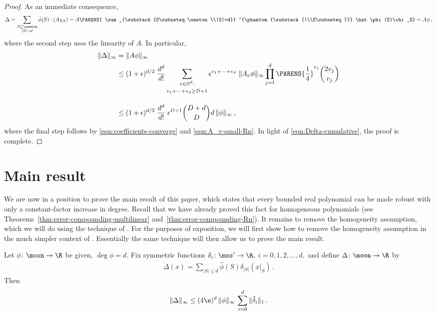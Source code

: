 \begin{proof}
As an immediate consequence, 
\begin{align*}
\Delta = \sum_{\substack{S\subseteq\oneton\\|S|=d}}
	\hat\phi(S)\cdot (A\chi_S)
       = A
	   \PARENS{
	   \sum_{\substack{S\subseteq\oneton\\|S|=d}}
	       ^{\phantom{\substack{|\\S\subseteq}}}
	   \hat\phi(S)\chi_S}
       = A\phi\,,
\end{align*}
where the second step uses the linearity of $A$. In 
particular,
\begin{align*}
\|\Delta\|_\infty &=\|A\phi\|_\infty \\
&\leq (1+\epsilon)^{d/2}\;\frac{d^d}{d!}\sum_{\substack{\rule{0mm}{2mm}v\in\mathbb
N^d:\\\rule{0mm}{3mm}v_1+\cdots+v_d\geq D+1}} 
 \epsilon^{v_1+\cdots+v_d}
  \; \|A_v\phi\|_\infty\prod_{j=1}^d
  \PARENS{\frac14}^{v_j}{2v_j\choose v_j}\\
&\rule{0mm}{9mm}\leq
(1+\epsilon)^{d/2}\;\frac{d^d}{d!}\;\epsilon^{D+1}{D+d\choose D}
d\,\|\phi\|_\infty\,,
\end{align*}
where the final step follows by
\eqref{eqn:coefficients-converge} and
\eqref{eqn:A_v-small-Rn}.
In light of \eqref{eqn:Delta-cumulative}, the proof is
complete.
\end{proof}




\section{Main result}
\label{sec:main}


We are now in a position to prove the main result of this
paper, which states that every bounded real polynomial 
can be made robust with only a constant-factor increase
in degree. Recall that we have already proved this fact for
homogeneous polynomials (see
Theorems~\ref{thm:error-compounding-multilinear}
and~\ref{thm:error-compounding-Rn}). It remains to
remove the homogeneity assumption, which we will do using
the technique of .
For the purposes of exposition, we will first show how
to remove the homogeneity assumption in the much
simpler context of
.
Essentially the same technique will then allow us to
prove the main result.

\begin{theorem}
\label{thm:cumulative-error-nonhomog-multilinear}
Let $\phi\colon\moon\to\R$ be given, $\deg\phi=d$.
Fix symmetric functions $\delta_i\colon\moo^i\to\R,$
$i=0,1,2,\dots,d,$
and define $\Delta\colon\moon\to\R$ by
\begin{align*}
\Delta(x)=\sum_{|S|\leq d}
\hat\phi(S)\delta_{|S|}(x|_S)\,.
\end{align*}
Then
\begin{align*}
\|\Delta\|_\infty \leq (4\e)^d\, \|\phi\|_\infty
\,\sum_{i=0}^d \|\hat\delta_i\|_1\,.
\end{align*}
\end{theorem}

